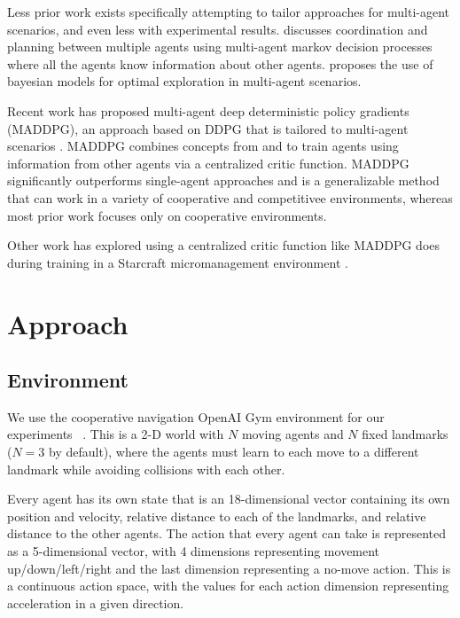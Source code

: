 \documentclass{article}
\begin{document}
Less prior work exists specifically attempting to tailor approaches for multi-agent scenarios, and even less with experimental results. \cite{boutilier1996planning} discusses coordination and planning between multiple agents using multi-agent markov decision processes where all the agents know information about other agents. \cite{chalkiadakis2003coordination} proposes the use of bayesian models for optimal exploration in multi-agent scenarios.

Recent work has proposed multi-agent deep deterministic policy gradients (MADDPG), an approach based on DDPG that is tailored to multi-agent scenarios \cite{maddpg}. MADDPG combines concepts from \cite{suttonbarto1998rl} and \cite{lillicrap2015continuous} to train agents using information from other agents via a centralized critic function. MADDPG significantly outperforms single-agent approaches and is a generalizable method that can work in a variety of cooperative and competitivee environments, whereas most prior work focuses only on cooperative environments.

Other work has explored using a centralized critic function like MADDPG does during training in a Starcraft micromanagement environment \cite{coma}.

\section{Approach}

\subsection{Environment}

We use the cooperative navigation OpenAI Gym environment for our experiments ~\cite{openaigym}. This is a 2-D world with $N$ moving agents and $N$ fixed landmarks ($N=3$ by default), where the agents must learn to each move to a different landmark while avoiding collisions with each other.

Every agent has its own state that is an 18-dimensional vector containing its own position and velocity, relative distance to each of the landmarks, and relative distance to the other agents. The action that every agent can take is represented as a 5-dimensional vector, with 4 dimensions representing movement up/down/left/right and the last dimension representing a no-move action. This is a continuous action space, with the values for each action dimension representing acceleration in a given direction.
\end{document}
